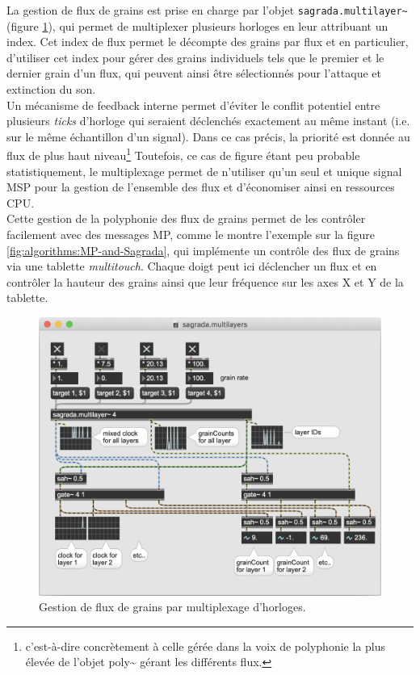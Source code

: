 \noindent La gestion de flux de grains est prise en charge par l'objet \verb|sagrada.multilayer~| (figure \ref{fig:algorithms:MP-multilayers}), qui permet de multiplexer plusieurs horloges en leur attribuant un index. Cet index de flux permet le décompte des grains par flux et en particulier, d'utiliser cet index pour gérer des grains individuels tels que le premier et le dernier grain d'un flux, qui peuvent ainsi être sélectionnés pour l'attaque et extinction du son.\\
\indent Un mécanisme de feedback interne permet d'éviter le conflit potentiel entre plusieurs \textit{ticks} d'horloge qui seraient déclenchés exactement au même instant (i.e. sur le même échantillon d'un signal). Dans ce cas précis, la priorité est donnée au flux de plus haut niveau\footnote{c'est-à-dire concrètement à celle gérée dans la voix de polyphonie la plus élevée de l'objet poly\textasciitilde{} gérant les différents flux.} Toutefois, ce cas de figure étant peu probable statistiquement, le multiplexage permet de n'utiliser qu'un seul et unique signal \gls{MSP} pour la gestion de l'ensemble des flux et d'économiser ainsi en ressources \gls{CPU}.\\
\indent Cette gestion de la polyphonie des flux de grains permet de les contrôler facilement avec des messages MP, comme le montre l'exemple sur la figure \ref{fig:algorithms:MP-and-Sagrada}, qui implémente un contrôle des flux de grains via une tablette \textit{multitouch}. Chaque doigt peut ici déclencher un flux et en contrôler la hauteur des grains ainsi que leur fréquence sur les axes X et Y de la tablette.

\begin{figure}[!htbp]
	\captionsetup{format=plain}
	\includegraphics[width=\textwidth]{gfx/04_algorithms/Sagrada-multilayers.png}
	\caption[Sagrada : gestion de flux de grains]{Gestion de flux de grains par multiplexage d'horloges.}
	\label{fig:algorithms:MP-multilayers}
\end{figure}

